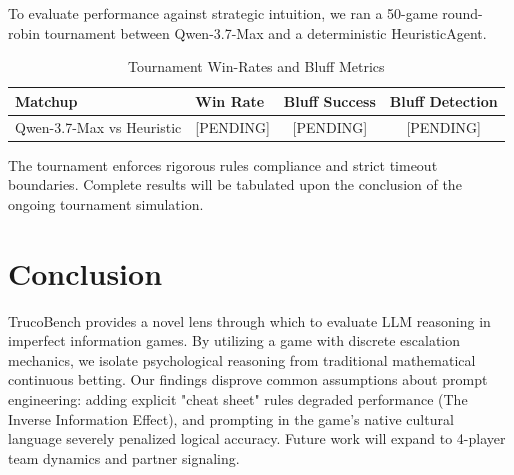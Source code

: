 \documentclass[11pt]{article}
\begin{document}
To evaluate performance against strategic intuition, we ran a 50-game round-robin tournament between Qwen-3.7-Max and a deterministic HeuristicAgent. 

\begin{table}[htbp]
\centering
\caption{Tournament Win-Rates and Bluff Metrics}
\label{tab:tournament}
\begin{tabular}{@{}llcc@{}}
\toprule
Matchup & Win Rate & Bluff Success & Bluff Detection \\
\midrule
Qwen-3.7-Max vs Heuristic & [PENDING] & [PENDING] & [PENDING] \\
\bottomrule
\end{tabular}
\end{table}

The tournament enforces rigorous rules compliance and strict timeout boundaries. Complete results will be tabulated upon the conclusion of the ongoing tournament simulation.

\FloatBarrier

\section{Conclusion}
TrucoBench provides a novel lens through which to evaluate LLM reasoning in imperfect information games. By utilizing a game with discrete escalation mechanics, we isolate psychological reasoning from traditional mathematical continuous betting. Our findings disprove common assumptions about prompt engineering: adding explicit "cheat sheet" rules degraded performance (The Inverse Information Effect), and prompting in the game's native cultural language severely penalized logical accuracy. Future work will expand to 4-player team dynamics and partner signaling.
\end{document}
